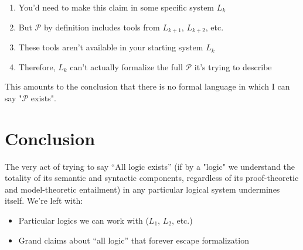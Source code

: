 \documentclass[12pt]{article}
\newcommand{\Pround}{\mathscr{P}}
\begin{document}
\begin{enumerate}
    \item You'd need to make this claim in some specific system $L_k$
    \item But $\Pround$ by definition includes tools from $L_{k+1}$, $L_{k+2}$, etc.
    \item These tools aren't available in your starting system $L_k$
    \item Therefore, $L_k$ can't actually formalize the full $\Pround$ it's trying to describe
\end{enumerate}

This amounts to the conclusion that there is no formal language in which I can say "$\Pround$ exists". 

\section{Conclusion}

The very act of trying to say ``All logic exists''  (if by a "logic" we understand the totality of its semantic and syntactic components, regardless of its proof-theoretic and model-theoretic entailment) in any particular logical system undermines itself. We're left with:

\begin{itemize}
    \item Particular logics we can work with ($L_1$, $L_2$, etc.)
    \item Grand claims about ``all logic'' that forever escape formalization
\end{itemize}
\end{document}
